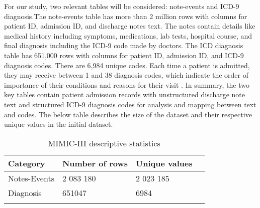 \documentclass[journal,article,submit,pdftex,moreauthors]{Definitions/mdpi}
\begin{document}
For our study, two relevant tables will be considered: note-events and ICD-9 diagnosis.The note-events table has more than 2 million rows with columns for patient ID, admission ID, and discharge notes text. The notes contain details like medical history including symptoms, medications, lab tests, hospital course, and final diagnosis including the ICD-9 code made by doctors.
The ICD diagnosis table has 651,000 rows with columns for patient ID, admission ID, and ICD-9 diagnosis codes. There are 6,984 unique codes. Each time a patient is admitted, they may receive between 1 and 38 diagnosis codes, which indicate the order of importance of their conditions and reasons for their visit \cite{ref-journal2}.
In summary, the two key tables contain patient admission records with unstructured discharge note text and structured ICD-9 diagnosis codes for analysis and mapping between text and codes. The below table describes the size of the dataset and their respective unique values in the initial dataset.
\begin{table}[h]
\caption{MIMIC-III descriptive statistics}\label{tab1}%
\begin{tabular}{@{}llll@{}}
\toprule
Category & Number of rows  & Unique values \\
\midrule
Notes-Events    & 2 083 180   & 2 023 185 \\
Diagnosis    & 651047   & 6984 \\

\botrule
\end{tabular}
\end{table}
\end{document}

